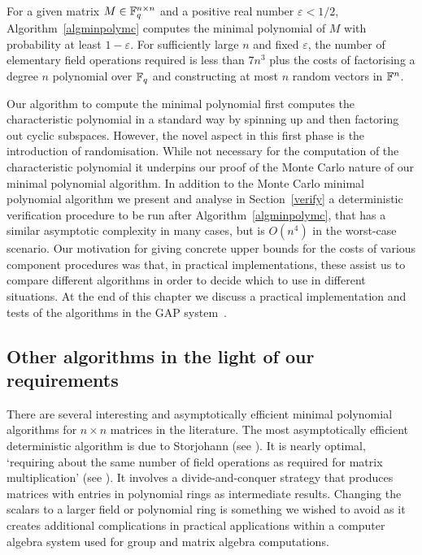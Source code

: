\begin{Theo}\label{main}
For a given matrix $M \in \mathbb{F}_q^{n \times n}$ and a positive 
real number $\varepsilon < 1/2$, Algorithm~\ref{algminpolymc}
computes the minimal polynomial of $M$ with probability at least $1-\varepsilon$.
For sufficiently large $n$ and fixed $\varepsilon$, the number of elementary 
field operations required is less than $7n^3$ plus the costs of 
factorising a degree $n$ polynomial over\/ $\mathbb{F}_q$ and constructing at most $n$
random vectors in\/ $\mathbb{F}^n$.
\end{Theo}


Our algorithm to compute the minimal polynomial first computes the
characteristic polynomial in a standard way by spinning up and then
factoring out cyclic
subspaces. However, the novel aspect in this first phase
is the introduction of randomisation. While
not necessary for the computation of the characteristic polynomial
it underpins our proof of the Monte Carlo 
nature of our minimal polynomial algorithm. In addition to the Monte Carlo
minimal polynomial algorithm
we present and analyse in Section~\ref{verify} a deterministic
verification procedure to
%
be run after Algorithm~\ref{algminpolymc}, that has a similar asymptotic
complexity in many cases, but is $O(n^4)$ in the worst-case scenario.
Our motivation for giving concrete upper bounds for the costs of 
various component procedures was that, in practical implementations, 
these assist us to compare different algorithms in order to 
decide which to use in different situations. At the end of this chapter we discuss
a practical implementation and tests of the algorithms in the {\sf GAP}
system~\cite{GAP4}.

\subsection{Other algorithms in the light of our requirements}

There are several interesting and asymptotically efficient
minimal polynomial algorithms for $n\times n$ matrices in the literature. The most  
asymptotically efficient deterministic algorithm is due to Storjohann 
(see \cite{Stor01}). It is nearly optimal, `requiring about the same number of 
field operations as required for matrix 
multiplication' (see \cite[Abstract, p368]{Stor01}). 
It involves a divide-and-conquer strategy that produces matrices 
with entries in polynomial rings as intermediate results. 
Changing the scalars to a larger field or polynomial ring is 
something we wished to avoid as it creates additional complications in practical 
applications within a computer algebra system used for group and 
matrix algebra computations.


